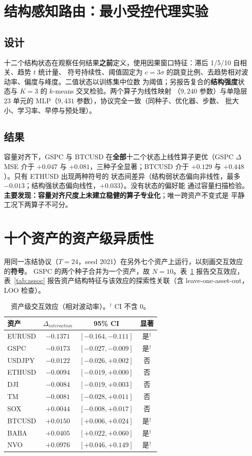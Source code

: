 \documentclass[conference]{IEEEtran}
\begin{document}
\section{结构感知路由：最小受控代理实验}
\label{sec:routing}
\subsection{设计}
十二个结构状态在观察任何结果\textbf{之前}定义，使用因果窗口特征：滞后 1/5/10 自相关、趋势 $t$ 统计量、
符号持续性、阈值固定为 $c=3\sigma$ 的跳变比例、去趋势相对波动率、偏度与峰度。二值状态以训练集中位数
为阈值；另报告复合的\textbf{结构强度}状态与 $K{=}3$ 的 $k$-means 交叉检验。两个算子为线性映射
（$9{,}240$ 参数）与单隐层 23 单元的 MLP（$9{,}431$ 参数），协议完全一致（同种子、优化器、步数、
批大小、学习率、早停与预处理）。

\subsection{结果}
容量对齐下，GSPC 与 BTCUSD 在\textbf{全部}十二个状态上线性算子更优（GSPC $\Delta$MSE 介于
$+0.047$ 与 $+0.081$，三种子全显著；BTCUSD 介于 $+0.129$ 与 $+0.448$）。只有 ETHUSD 出现两种符号的
状态间差异（结构弱状态偏向非线性，最多 $-0.013$；结构强状态偏向线性，$+0.033$）。没有状态的偏好能
通过容量扫描检验。\textbf{主要发现：容量对齐尺度上未建立稳健的算子专业化}；唯一跨资产不变式是
平静工况下两算子不可分。

\section{十个资产的资产级异质性}
用同一冻结协议（$T=24$，seed 2021）在另外七个资产上运行，以刻画交互效应的\textbf{符号}。
GSPC 的两个种子合并为一个资产，故 $N=10$。表~\ref{tab:assets} 报告交互效应，
表~\ref{tab:assoc} 报告资产结构特征与该效应的探索性关联（含 leave-one-asset-out，LOO 检查）。

\begin{table}[!t]
\caption{资产级交互效应（相对波动率）。$^\dagger$ CI 不含 0。}
\label{tab:assets}
\centering
\small
\begin{tabular}{@{}lccc@{}}
\toprule
资产 & $\Delta_{interaction}$ & 95\% CI & 显著 \\
\midrule
EURUSD & $-0.1371$ & $[-0.164,-0.111]$ & 是$^\dagger$ \\
GSPC   & $-0.0173$ & $[-0.027,-0.009]$ & 是$^\dagger$ \\
USDJPY & $-0.0122$ & $[-0.026,+0.002]$ & 否 \\
ETHUSD & $-0.0094$ & $[-0.019,+0.000]$ & 否 \\
DJI    & $-0.0084$ & $[-0.019,+0.003]$ & 否 \\
TM     & $-0.0081$ & $[-0.028,+0.011]$ & 否 \\
SOX    & $+0.0044$ & $[-0.008,+0.017]$ & 否 \\
BTCUSD & $+0.0150$ & $[+0.006,+0.024]$ & 是$^\dagger$ \\
BABA   & $+0.0405$ & $[+0.022,+0.060]$ & 是$^\dagger$ \\
NVO    & $+0.0976$ & $[+0.046,+0.149]$ & 是$^\dagger$ \\
\bottomrule
\end{tabular}
\end{table}
\end{document}
